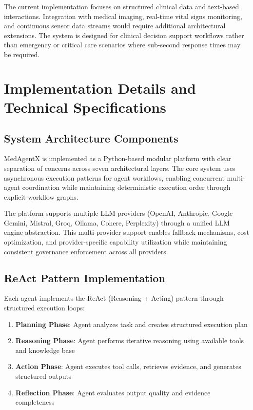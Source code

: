 \documentclass[journal]{IEEEtran}
\begin{document}
The current implementation focuses on structured clinical data and text-based interactions. Integration with medical imaging, real-time vital signs monitoring, and continuous sensor data streams would require additional architectural extensions. The system is designed for clinical decision support workflows rather than emergency or critical care scenarios where sub-second response times may be required.

\newpage
\section{Implementation Details and Technical Specifications}

\subsection{System Architecture Components}
MedAgentX is implemented as a Python-based modular platform with clear separation of concerns across seven architectural layers. The core system uses asynchronous execution patterns for agent workflows, enabling concurrent multi-agent coordination while maintaining deterministic execution order through explicit workflow graphs.

The platform supports multiple LLM providers (OpenAI, Anthropic, Google Gemini, Mistral, Groq, Ollama, Cohere, Perplexity) through a unified LLM engine abstraction. This multi-provider support enables fallback mechanisms, cost optimization, and provider-specific capability utilization while maintaining consistent governance enforcement across all providers.

\subsection{ReAct Pattern Implementation}
Each agent implements the ReAct (Reasoning + Acting) pattern through structured execution loops:

\begin{enumerate}
    \item \textbf{Planning Phase}: Agent analyzes task and creates structured execution plan
    \item \textbf{Reasoning Phase}: Agent performs iterative reasoning using available tools and knowledge base
    \item \textbf{Action Phase}: Agent executes tool calls, retrieves evidence, and generates structured outputs
    \item \textbf{Reflection Phase}: Agent evaluates output quality and evidence completeness
\end{enumerate}
\end{document}
